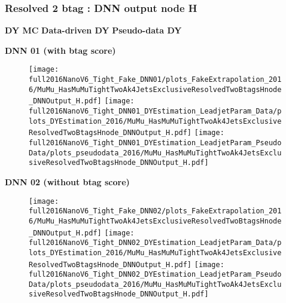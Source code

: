 \documentclass[9pt]{beamer}
\begin{document}
\begin{frame}
	\frametitle{Resolved 2 btag : DNN output node H}
    \hspace{2cm} \textbf{DY MC} \hspace{1.9cm} \textbf{Data-driven DY} \hspace{1cm} \textbf{Pseudo-data DY}
    \begin{center}
        \textbf{DNN 01 (with btag score)}
    \end{center}
	\begin{figure}
		\texttt{[image: full2016NanoV6\_Tight\_Fake\_DNN01/plots\_FakeExtrapolation\_2016/MuMu\_HasMuMuTightTwoAk4JetsExclusiveResolvedTwoBtagsHnode\_DNNOutput\_H.pdf]}
		\texttt{[image: full2016NanoV6\_Tight\_DNN01\_DYEstimation\_LeadjetParam\_Data/plots\_DYEstimation\_2016/MuMu\_HasMuMuTightTwoAk4JetsExclusiveResolvedTwoBtagsHnode\_DNNOutput\_H.pdf]}
		\texttt{[image: full2016NanoV6\_Tight\_DNN01\_DYEstimation\_LeadjetParam\_PseudoData/plots\_pseudodata\_2016/MuMu\_HasMuMuTightTwoAk4JetsExclusiveResolvedTwoBtagsHnode\_DNNOutput\_H.pdf]}
	\end{figure}
    \begin{center}
        \textbf{DNN 02 (without btag score)}
    \end{center}
	\begin{figure}
		\texttt{[image: full2016NanoV6\_Tight\_Fake\_DNN02/plots\_FakeExtrapolation\_2016/MuMu\_HasMuMuTightTwoAk4JetsExclusiveResolvedTwoBtagsHnode\_DNNOutput\_H.pdf]}
		\texttt{[image: full2016NanoV6\_Tight\_DNN02\_DYEstimation\_LeadjetParam\_Data/plots\_DYEstimation\_2016/MuMu\_HasMuMuTightTwoAk4JetsExclusiveResolvedTwoBtagsHnode\_DNNOutput\_H.pdf]}
		\texttt{[image: full2016NanoV6\_Tight\_DNN02\_DYEstimation\_LeadjetParam\_PseudoData/plots\_pseudodata\_2016/MuMu\_HasMuMuTightTwoAk4JetsExclusiveResolvedTwoBtagsHnode\_DNNOutput\_H.pdf]}
	\end{figure}
\end{frame}
\end{document}
